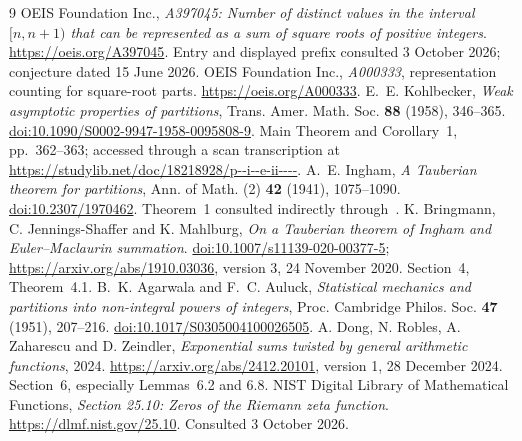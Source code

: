 \documentclass[11pt]{article}
\numberwithin{equation}{section}
\theoremstyle{remark}\newtheorem{remark}[theorem]{Remark}
\begin{document}
\clearpage
\begin{thebibliography}{9}
OEIS Foundation Inc., \emph{A397045: Number of distinct values in the interval $[n,n+1)$ that can be represented as a sum of square roots of positive integers}.
\url{https://oeis.org/A397045}. Entry and displayed prefix consulted 3 October 2026; conjecture dated 15 June 2026.
OEIS Foundation Inc., \emph{A000333}, representation counting for square-root parts.
\url{https://oeis.org/A000333}.
E.~E. Kohlbecker, \emph{Weak asymptotic properties of partitions}, Trans. Amer. Math. Soc. \textbf{88} (1958), 346--365.
\href{https://doi.org/10.1090/S0002-9947-1958-0095808-9}{doi:10.1090/S0002-9947-1958-0095808-9}.
Main Theorem and Corollary~1, pp.~362--363; accessed through a scan transcription at
\url{https://studylib.net/doc/18218928/p--i--e-ii----}.
A.~E. Ingham, \emph{A Tauberian theorem for partitions}, Ann. of Math. (2) \textbf{42} (1941), 1075--1090.
\href{https://doi.org/10.2307/1970462}{doi:10.2307/1970462}.
Theorem~1 consulted indirectly through~\cite{BJM}.
K. Bringmann, C. Jennings-Shaffer and K. Mahlburg,
\emph{On a Tauberian theorem of Ingham and Euler--Maclaurin summation}.
\href{https://doi.org/10.1007/s11139-020-00377-5}{doi:10.1007/s11139-020-00377-5};
\url{https://arxiv.org/abs/1910.03036}, version 3, 24 November 2020.
Section~4, Theorem~4.1.
B.~K. Agarwala and F.~C. Auluck,
\emph{Statistical mechanics and partitions into non-integral powers of integers},
Proc. Cambridge Philos. Soc. \textbf{47} (1951), 207--216.
\href{https://doi.org/10.1017/S0305004100026505}{doi:10.1017/S0305004100026505}.
A. Dong, N. Robles, A. Zaharescu and D. Zeindler,
\emph{Exponential sums twisted by general arithmetic functions}, 2024.
\url{https://arxiv.org/abs/2412.20101}, version 1, 28 December 2024.
Section~6, especially Lemmas~6.2 and 6.8.
NIST Digital Library of Mathematical Functions, \emph{Section 25.10: Zeros of the Riemann zeta function}.
\url{https://dlmf.nist.gov/25.10}. Consulted 3 October 2026.
\end{thebibliography}
\end{document}
